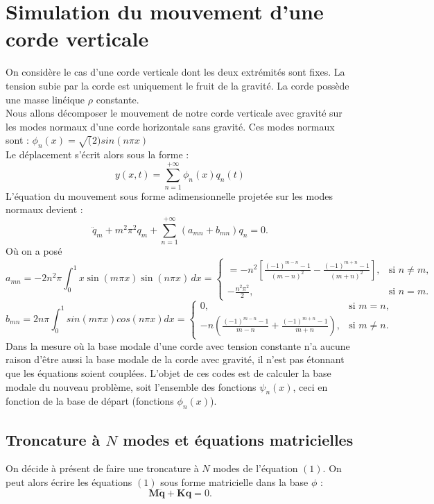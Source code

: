 \documentclass[a4paper,11pt]{article}
\begin{document}
	
	\section*{Simulation du mouvement d'une corde verticale}
	
	On considère le cas d'une corde verticale dont les deux extrémités sont fixes. La tension subie par la corde est uniquement le fruit de la gravité. La corde possède une masse linéique $\rho$ constante. \\
	Nous allons décomposer le mouvement de notre corde verticale avec gravité sur les modes normaux d'une corde horizontale sans gravité. Ces modes normaux sont : $\phi_n(x)=\sqrt(2)sin(n\pi x)$\\
	Le déplacement s'écrit alors sous la forme : 
	\[
	y(x,t)=\sum_{n=1}^{+\infty} \phi_n(x)q_n(t)
	\]
	L'équation du mouvement sous forme adimensionnelle projetée sur les modes normaux devient :
	\[
	\ddot{q}_m + m^2\pi^2q_m + \sum_{n=1}^{+\infty} \left(a_{mn} + b_{mn}\right)q_n = 0.
	\tag{1}
	\]
	Où on a posé 
	\[
	a_{mn} = -2n^2\pi \displaystyle\int_{0}^{1} x \sin(m\pi x)\sin(n\pi x)\,dx = 
	\begin{cases}
		= -n^2 \left[\frac{(-1)^{m-n} -1}{(m-n)^2} - \frac{(-1)^{m+n} -1}{(m+n)^2}\right], & \text{si } n \neq m, \\[10pt]
		-\frac{n^2\pi^2}{2}, & \text{si } n = m.
	\end{cases}
	\]
	\[
	b_{mn}=2n\pi \int_{0}^{1} sin(m\pi x)cos(n\pi x)dx=
	\begin{cases}
		0, & \text{si } m = n, \\[10pt]
		-n \left( \frac{(-1)^{m-n} - 1}{m-n} + \frac{(-1)^{m+n} - 1}{m+n} \right), & \text{si } m \neq n.
	\end{cases}
	\]
	Dans la mesure où la base modale d’une corde avec tension constante n’a aucune raison d’être aussi la base modale de la corde avec gravité, il n’est pas étonnant que les équations soient couplées. L’objet de ces codes est de calculer la base modale du nouveau problème, soit l’ensemble des fonctions $\psi_n(x)$, ceci en fonction de la base de départ (fonctions $\phi_n(x)$).
	
	\subsection*{Troncature à \(N\) modes et équations matricielles}
	
	On décide à présent de faire une troncature à \(N\) modes de l’équation \((1)\). On peut alors écrire les équations \((1)\) sous forme matricielle dans la base $\phi$ :
	\[
	\mathbf{M}\ddot{\mathbf{q}} + \mathbf{K}\mathbf{q} = 0.
	\tag{2}
	\]
	
\end{document}
